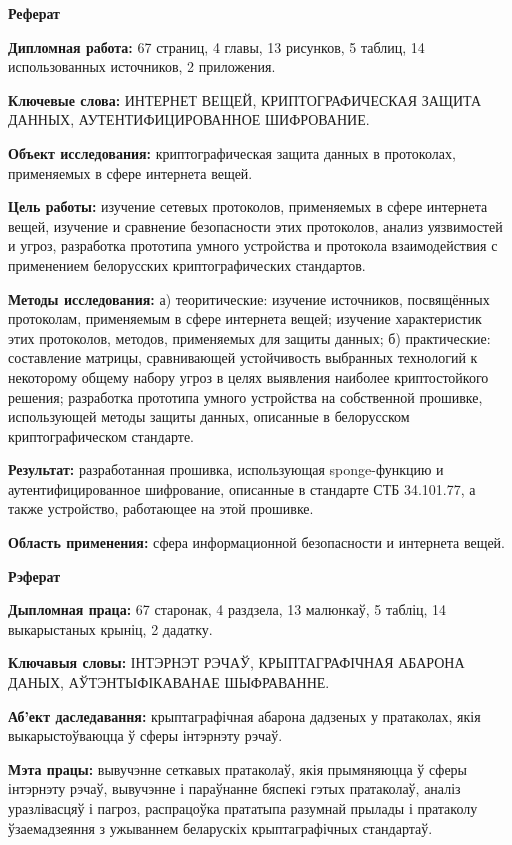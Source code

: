 \newpage
\begin{center}{\bf \Large Реферат}\end{center}
  
\textbf{Дипломная работа:} 67 страниц, 4 главы, 13 рисунков, 5 таблиц, 14 использованных источников,
2 приложения.

\textbf{Ключевые слова:} ИНТЕРНЕТ ВЕЩЕЙ, КРИПТОГРАФИЧЕСКАЯ ЗАЩИТА ДАННЫХ, 
АУТЕНТИФИЦИРОВАННОЕ ШИФРОВАНИЕ.

\textbf{Объект исследования:} криптографическая защита данных в протоколах, применяемых в сфере 
интернета вещей.

\textbf{Цель работы:} изучение сетевых протоколов, применяемых в сфере интернета вещей, изучение
и сравнение безопасности этих протоколов, анализ уязвимостей и угроз, разработка прототипа умного
устройства и протокола взаимодействия с применением белорусских криптографических стандартов.

\textbf{Методы исследования:} а) теоритические: изучение источников, посвящённых протоколам,
применяемым в сфере интернета вещей; изучение характеристик этих протоколов, методов, применяемых
для защиты данных; б) практические: составление матрицы, сравнивающей устойчивость выбранных 
технологий к некоторому общему набору угроз в целях выявления наиболее криптостойкого решения;
разработка прототипа умного устройства на собственной прошивке, использующей методы защиты
данных, описанные в белорусском криптографическом стандарте.

\textbf{Результат:} разработанная прошивка, использующая sponge-функцию и аутентифицированное
шифрование, описанные в стандарте СТБ 34.101.77, а также устройство, работающее на этой прошивке.

\textbf{Область применения:} сфера информационной безопасности и интернета вещей.



\newpage
\begin{center}{\bf \Large Рэферат}\end{center}

\textbf{Дыпломная праца:} 67 старонак, 4 раздзела, 13 малюнкаў, 5 табліц, 14 выкарыстаных крыніц,
2 дадатку.

\textbf{Ключавыя словы:} ІНТЭРНЭТ РЭЧАЎ, КРЫПТАГРАФІЧНАЯ АБАРОНА ДАНЫХ, АЎТЭНТЫФІКАВАНАЕ 
ШЫФРАВАННЕ.

\textbf{Аб'ект даследавання:} крыптаграфічная абарона дадзеных у пратаколах, якія выкарыстоўваюцца 
ў сферы інтэрнэту рэчаў.

\textbf{Мэта працы:} вывучэнне сеткавых пратаколаў, якія прымяняюцца ў сферы інтэрнэту рэчаў, вывучэнне 
і параўнанне бяспекі гэтых пратаколаў, аналіз уразлівасцяў і пагроз, распрацоўка прататыпа разумнай прылады 
і пратаколу ўзаемадзеяння з ужываннем беларускіх крыптаграфічных стандартаў.

